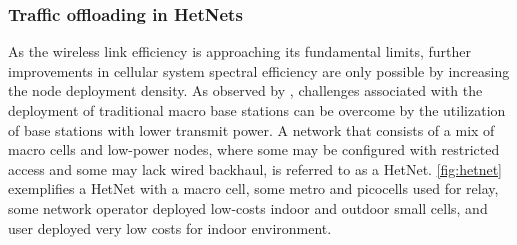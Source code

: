 %
%
%
%

\subsubsection{Traffic offloading in \acsp{HetNet}}
\label{subsec:heterogeneous}

As the wireless link efficiency is approaching its fundamental limits, further
improvements in cellular system spectral efficiency are only possible by
increasing the node deployment density. As observed by \citet{Damnjanovic2011},
challenges associated with the deployment of traditional macro base stations
can be overcome by the utilization of base stations with lower transmit power.
A network that consists of a mix of macro cells and low-power nodes, where some
may be configured with restricted access and some may lack wired backhaul, is
referred to as a \acf{HetNet}. \autoref{fig:hetnet} exemplifies a \ac{HetNet}
with a macro cell, some metro and picocells used for relay, some network
operator deployed low-costs indoor and outdoor small cells, and user deployed
very low costs for indoor environment.

